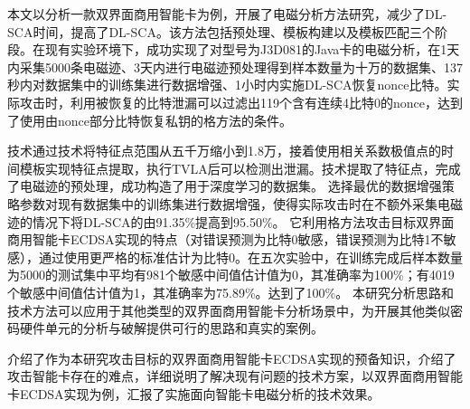 {		
	本文以分析一款双界面商用智能卡为例，开展了电磁分析方法研究，减少了DL-SCA时间，提高了DL-SCA\zyx。该方法包括预处理、模板构建以及模板匹配三个阶段。在现有实验环境下，成功实现了对型号为J3D081的Java卡的电磁分析，在1天内采集5000条电磁迹、3天内进行电磁迹预处理得到样本数量为十万的数据集、137秒内对数据集中的训练集进行数据增强、1小时内实施DL-SCA恢复nonce比特。实际攻击时，利用被恢复的比特泄漏可以过滤出119个含有连续4比特0的nonce，达到了使用由nonce部分比特恢复私钥的格方法的条件。%
	
	\yuchuli 技术通过\poifanwei 技术将特征点范围从五千万缩小到1.8万，接着使用相关系数极值点的时间模板实现特征点提取，执行TVLA后可以检测出泄漏。\yuchuli 技术提取了特征点，完成了电磁迹的预处理，成功构造了用于深度学习的数据集。
	\shujuzengqiang 选择最优的数据增强策略参数对现有数据集中的训练集进行数据增强，使得实际攻击时在不额外采集电磁迹的情况下将DL-SCA的\zyx 由91.35\%提高到95.50\%。
	\jiashejianyanguji 它利用格方法攻击目标双界面商用智能卡ECDSA实现的特点（对错误预测为比特0敏感，错误预测为比特1不敏感），通过使用更严格的标准估计为比特0。在五次实验中，在训练完成后样本数量为5000的测试集中平均有981个敏感中间值估计值为0，其准确率为100\%；有4019个敏感中间值估计值为1，其准确率为75.89\%。\zyx 达到了100\%。
	本研究分析思路和技术方法可以应用于其他类型的双界面商用智能卡分析场景中，为开展其他类似密码硬件单元的分析与破解提供可行的思路和真实的案例。
	
	介绍了作为本研究攻击目标的双界面商用智能卡ECDSA实现的预备知识，介绍了攻击智能卡存在的难点，详细说明了解决现有问题的技术方案，以双界面商用智能卡ECDSA实现为例，汇报了实施面向智能卡电磁分析的技术效果。
	
}
